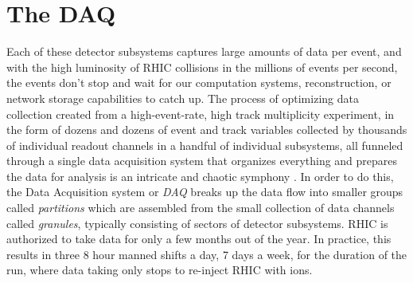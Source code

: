 \section{The DAQ}
Each of these detector subsystems captures large amounts of data per event, and with the high luminosity of RHIC collisions in the millions of events per second, the events don't stop and wait for our computation systems, reconstruction, or network storage capabilities to catch up. The process of optimizing data collection created from a high-event-rate, high track multiplicity experiment, in the form of dozens and dozens of event and track variables collected by thousands of individual readout channels in a handful of individual subsystems, all funneled through a single data acquisition system that organizes everything and prepares the data for analysis is an intricate and chaotic symphony \citep{DAQfocus}. In order to do this, the Data Acquisition system or \textit{DAQ} breaks up the data flow into smaller groups called \textit{partitions} which are assembled from the small collection of data channels called \textit{granules}, typically consisting of sectors of detector subsystems. RHIC is authorized to take data for only a few months out of the year. In practice, this results in three 8 hour manned shifts a day, 7 days a week, for the duration of the run, where data taking only stops to re-inject RHIC with ions.

